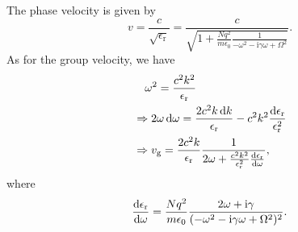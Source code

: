 \documentclass[hyperref, a4paper]{article}
\newcommand*{\ii}{\mathrm{i}}
\newcommand{\epsr}{\epsilon_{\text{r}}}
\begin{document}
The phase velocity is given by 
\begin{equation}
    v = \frac{c}{\sqrt{\epsr}} = \frac{c}{
        \sqrt{
            1 + \frac{N q^2}{m \epsilon_0} \frac{1}{- \omega^2 - \ii \gamma \omega + \Omega^2}
        }
    }.
\end{equation}
As for the group velocity, we have 
\begin{equation}
    \begin{aligned}
        &\quad \omega^2 = \frac{c^2 k^2}{\epsr} \\
        &\Rightarrow 2 \omega \dd{\omega} = 
        \frac{2 c^2 k \dd{k}}{\epsr} 
        - c^2 k^2 \frac{\dd{\epsr}}{\epsr^2} \\
        &\Rightarrow v_{\text{g}} = 
        \frac{2 c^2 k}{\epsr} \frac{1}{
            2 \omega + \frac{c^2 k^2}{\epsr^2} \dv{\epsr}{\omega}
        },
    \end{aligned}
\end{equation}
where 
\begin{equation}
    \dv{\epsr}{\omega} = \frac{N q^2}{m \epsilon_0}
    \frac{2 \omega + \ii \gamma}{(- \omega^2 - \ii \gamma \omega + \Omega^2)^2}.
\end{equation}

\subsubsection{}
\end{document}

